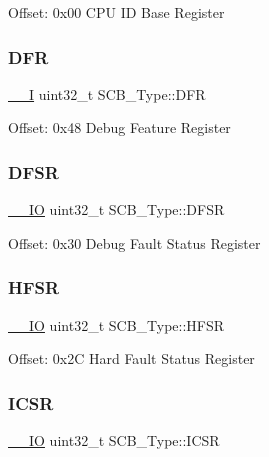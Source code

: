 Offset\+: 0x00 C\+PU ID Base Register ~\newline
 \mbox{\label{struct_s_c_b___type_a586a5225467262b378c0f231ccc77f86}} 
\subsubsection{\texorpdfstring{DFR}{DFR}}
{\footnotesize\ttfamily \mbox{\hyperlink{group___c_m_s_i_s___c_m3__core__definitions_gaf63697ed9952cc71e1225efe205f6cd3}{\+\_\+\+\_\+I}} uint32\+\_\+t S\+C\+B\+\_\+\+Type\+::\+D\+FR}

Offset\+: 0x48 Debug Feature Register ~\newline
 \mbox{\label{struct_s_c_b___type_ad7d61d9525fa9162579c3da0b87bff8d}} 
\subsubsection{\texorpdfstring{DFSR}{DFSR}}
{\footnotesize\ttfamily \mbox{\hyperlink{group___c_m_s_i_s___c_m3__core__definitions_gaec43007d9998a0a0e01faede4133d6be}{\+\_\+\+\_\+\+IO}} uint32\+\_\+t S\+C\+B\+\_\+\+Type\+::\+D\+F\+SR}

Offset\+: 0x30 Debug Fault Status Register ~\newline
 \mbox{\label{struct_s_c_b___type_a7bed53391da4f66d8a2a236a839d4c3d}} 
\subsubsection{\texorpdfstring{HFSR}{HFSR}}
{\footnotesize\ttfamily \mbox{\hyperlink{group___c_m_s_i_s___c_m3__core__definitions_gaec43007d9998a0a0e01faede4133d6be}{\+\_\+\+\_\+\+IO}} uint32\+\_\+t S\+C\+B\+\_\+\+Type\+::\+H\+F\+SR}

Offset\+: 0x2C Hard Fault Status Register ~\newline
 \mbox{\label{struct_s_c_b___type_a3e66570ab689d28aebefa7e84e85dc4a}} 
\subsubsection{\texorpdfstring{ICSR}{ICSR}}
{\footnotesize\ttfamily \mbox{\hyperlink{group___c_m_s_i_s___c_m3__core__definitions_gaec43007d9998a0a0e01faede4133d6be}{\+\_\+\+\_\+\+IO}} uint32\+\_\+t S\+C\+B\+\_\+\+Type\+::\+I\+C\+SR}

